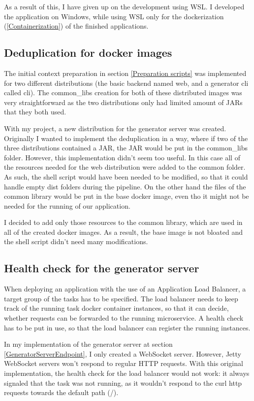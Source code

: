 		As a result of this, I have given up on the development using WSL. I developed the application on Windows, while using WSL only for the
		dockerization (\ref{Containerization}) of the finished applications.

	\subsection{Deduplication for docker images}
		The initial context preparation in section \ref{Preparation scripts} was implemented for two different distributions (the basic backend 
		named web, and a generator cli called cli). The common\_libs creation for both of these distributed images was very straightforward
		as the two distributions only had limited amount of JARs that they both used.

		With my project, a new distribution for the generator server was created. Originally I wanted to implement the deduplication in a way,
		where if two of the three distributions contained a JAR, the JAR would be put in the common\_libs folder.
		However, this implementation didn't seem too useful. In this case all of the resources needed for the web distribution were added to the common folder.
		As such, the shell script would have been needed to be modified, so that it could handle empty dist folders during the pipeline. On the other hand
		the files of the common library would be put in the base docker image, even tho it might not be needed for the running of our application.

		I decided to add only those resources to the common library, which are used in all of the created docker images. 
		As a result, the base image is not bloated and the shell script didn't need many modifications.

	\subsection{Health check for the generator server} \label{healthcheck}
		When deploying an application with the use of an Application Load Balancer, a target group of the tasks has to be specified.
		The load balancer needs to keep track of the running task docker container instances, so that it can decide, whether requests can be 
		forwarded to the running microservice. A health check has to be put in use, so that the load balancer can register the running instances.

		In my implementation of the generator server at section \ref{GeneratorServerEndpoint}, I only created a WebSocket server. However, Jetty 
		WebSocket servers won't respond to regular HTTP requests. With this original implementation, the health check for the load balancer would
		not work: it always signaled that the task was not running, as it wouldn't respond to the curl http requests towards the default path (/).

